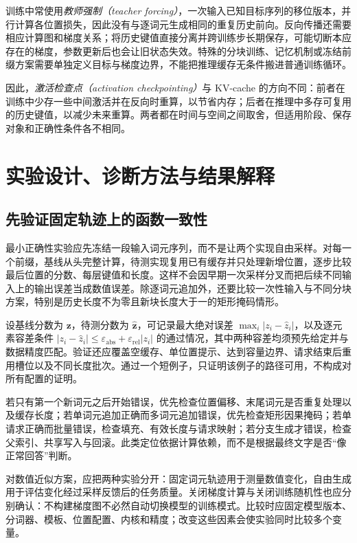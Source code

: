 \documentclass[UTF8,12pt,a4paper,fontset=fandol]{ctexart}
\begin{document}
训练中常使用\emph{教师强制（teacher forcing）}，一次输入已知目标序列的移位版本，并行计算各位置损失，因此没有与逐词元生成相同的重复历史前向。反向传播还需要相应计算图和梯度关系；将历史键值直接分离并跨训练步长期保存，可能切断本应存在的梯度，参数更新后也会让旧状态失效。特殊的分块训练、记忆机制或冻结前缀方案需要单独定义目标与梯度边界，不能把推理缓存无条件搬进普通训练循环。

因此，\emph{激活检查点（activation checkpointing）}与 KV-cache 的方向不同：前者在训练中少存一些中间激活并在反向时重算，以节省内存；后者在推理中多存可复用的历史键值，以减少未来重算。两者都在时间与空间之间取舍，但适用阶段、保存对象和正确性条件各不相同。

\section{实验设计、诊断方法与结果解释}
\label{sec:kv-validation}

\subsection{先验证固定轨迹上的函数一致性}

最小正确性实验应先冻结一段输入词元序列，而不是让两个实现自由采样。对每一个前缀，基线从头完整计算，待测实现复用已有缓存并只处理新增位置，逐步比较最后位置的分数、每层键值和长度。这样不会因早期一次采样分叉而把后续不同输入上的输出误差当成数值误差。除逐词元追加外，还要比较一次性输入与不同分块方案，特别是历史长度不为零且新块长度大于一的矩形掩码情形。

设基线分数为 $\mathbf z$，待测分数为 $\widehat{\mathbf z}$，可记录最大绝对误差 $\max_i|z_i-\widehat z_i|$，以及逐元素容差条件 $|z_i-\widehat z_i|\leq\varepsilon_{\mathrm{abs}}+\varepsilon_{\mathrm{rel}}|z_i|$ 的通过情况，其中两种容差均须预先给定并与数据精度匹配。验证还应覆盖空缓存、单位置提示、达到容量边界、请求结束后重用槽位以及不同长度批次。通过一个短例子，只证明该例子的路径可用，不构成对所有配置的证明。

若只有第一个新词元之后开始错误，优先检查位置偏移、末尾词元是否重复处理以及缓存长度；若单词元追加正确而多词元追加错误，优先检查矩形因果掩码；若单请求正确而批量错误，检查填充、有效长度与请求映射；若分支生成才错误，检查父索引、共享写入与回滚。此类定位依据计算依赖，而不是根据最终文字是否“像正常回答”判断。

对数值近似方案，应把两种实验分开：固定词元轨迹用于测量数值变化，自由生成用于评估变化经过采样反馈后的任务质量。关闭梯度计算与关闭训练随机性也应分别确认：不构建梯度图不必然自动切换模型的训练模式。比较时应固定模型版本、分词器、模板、位置配置、内核和精度；改变这些因素会使实验同时比较多个变量。
\end{document}
